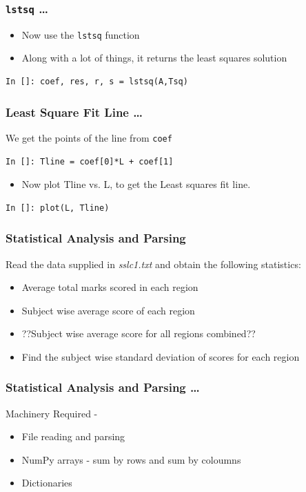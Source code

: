 \documentclass[14pt,compress]{beamer}
\newcommand{\typ}[1]{\lstinline{#1}}
\begin{document}
\begin{frame}[fragile]
\frametitle{\typ{lstsq} \ldots}
\begin{itemize}
\item Now use the \typ{lstsq} function
\item Along with a lot of things, it returns the least squares solution
\end{itemize}
\begin{lstlisting}
In []: coef, res, r, s = lstsq(A,Tsq)
\end{lstlisting}
\end{frame}

\begin{frame}[fragile]
\frametitle{Least Square Fit Line \ldots}
We get the points of the line from \typ{coef}
\begin{lstlisting}
In []: Tline = coef[0]*L + coef[1]
\end{lstlisting}
\begin{itemize}
\item Now plot Tline vs. L, to get the Least squares fit line. 
\end{itemize}
\begin{lstlisting}
In []: plot(L, Tline)
\end{lstlisting}
\end{frame}

\begin{frame}
  \frametitle{Statistical Analysis and Parsing}
  Read the data supplied in \emph{sslc1.txt} and obtain the following statistics:
  \begin{itemize}
    \item Average total marks scored in each region
    \item Subject wise average score of each region
    \item \alert{??Subject wise average score for all regions combined??}
    \item Find the subject wise standard deviation of scores for each region
  \end{itemize}
\end{frame}

\begin{frame}
  \frametitle{Statistical Analysis and Parsing \ldots}
  Machinery Required -
  \begin{itemize}
    \item File reading and parsing
    \item NumPy arrays - sum by rows and sum by coloumns
    \item Dictionaries
  \end{itemize}
\end{frame}
\end{document}
